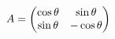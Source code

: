 \documentclass[preview]{standalone}
\begin{document}
\begin{align*}
\special{dvisvgm:raw <g id='unique000'>}A=\begin{pmatrix}\cos\theta&\sin\theta\\\sin\theta&-\cos\theta\end{pmatrix}\special{dvisvgm:raw </g>}
\end{align*}
\end{document}
